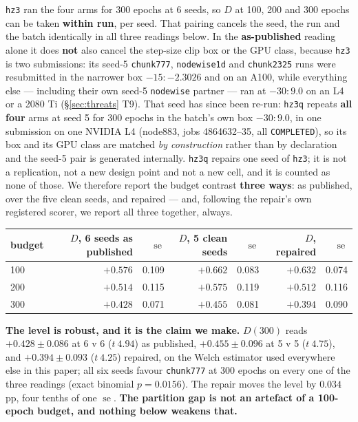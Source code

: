 \documentclass[10pt,letterpaper]{article}
\newcommand{\Dstat}{D}                         %
\newcommand{\arm}[1]{\texttt{#1}}
\DeclareMathOperator{\se}{se}
\begin{document}
\arm{hz3} ran the four arms for 300 epochs at 6 seeds, so $\Dstat$ at 100, 200 and 300 epochs can
be taken \textbf{within run}, per seed. That pairing cancels the seed, the run and the batch
identically in all three readings below. In the \textbf{as-published} reading alone it does
\textbf{not} also cancel the step-size clip box or the GPU class, because
\arm{hz3} is two submissions: its seed-5 \arm{chunk777}, \arm{nodewise1d} and \arm{chunk2325}
runs were resubmitted in the narrower box $-15{:}{-}2.3026$ and on an A100, while everything else
--- including their own seed-5 \arm{nodewise} partner --- ran at $-30{:}9.0$ on an L4 or a
2080 Ti (\S\ref{sec:threats} T9). That seed has since been re-run: \arm{hz3q} repeats
\textbf{all four} arms at seed 5 for 300 epochs in the batch's own box $-30{:}9.0$, in one
submission on one NVIDIA L4 (node883, jobs 4864632--35, all \texttt{COMPLETED}), so its box and
its GPU class are matched \emph{by construction} rather than by declaration and the seed-5 pair is
generated internally. \arm{hz3q} repairs one seed of \arm{hz3}; it is not a replication, not a new
design point and not a new cell, and it is counted as none of those. We therefore report the
budget contrast \textbf{three ways}: as published, over the five clean seeds, and repaired ---
and, following the repair's own registered scorer, we report all three together, always.

\begin{center}
\small
\begin{tabular}{@{}lrrrrrr@{}}
\toprule
budget & $\Dstat$, 6 seeds as published & $\se$ & $\Dstat$, 5 clean seeds & $\se$ &
  $\Dstat$, \textbf{repaired} & $\se$ \\
\midrule
100 & $+0.576$ & 0.109 & $+0.662$ & 0.083 & $\mathbf{+0.632}$ & 0.074 \\
200 & $+0.514$ & 0.115 & $+0.575$ & 0.119 & $\mathbf{+0.512}$ & 0.116 \\
300 & $+0.428$ & 0.071 & $+0.455$ & 0.081 & $\mathbf{+0.394}$ & 0.090 \\
\bottomrule
\end{tabular}
\end{center}

\textbf{The level is robust, and it is the claim we make.} $\Dstat(300)$ reads
$+0.428 \pm 0.086$ at 6 v 6 ($t\ 4.94$) as published, $+0.455 \pm 0.096$ at 5 v 5 ($t\ 4.75$),
and $\mathbf{+0.394 \pm 0.093}$ ($t\ \mathbf{4.25}$) repaired, on the Welch estimator used
everywhere else in this paper; all six seeds favour \arm{chunk777} at 300 epochs on every one of
the three readings (exact binomial $p = 0.0156$). The repair moves the level by $0.034$ pp, four
tenths of one $\se$. \textbf{The partition gap is not an artefact of a 100-epoch budget, and
nothing below weakens that.}
\end{document}
